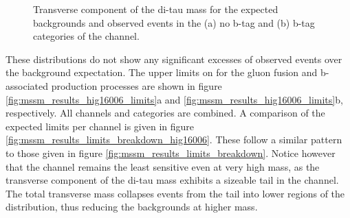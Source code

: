 \begin{figure}[h!]
\begin{center}
\end{center}
\caption[Transverse component of the di-tau mass for the expected backgrounds
and observed events in the no b-tag and b-tag categories of the \emu channel.]{Transverse component of the di-tau mass for the expected backgrounds and
observed events in the (a) no b-tag and (b) b-tag categories of the \emu channel.}
\label{fig:mssm_hig16006_mtsv_em}
\end{figure}
\clearpage

These distributions do not show any significant excesses of observed events over
the background expectation. The upper limits
on \xsbr for the gluon fusion and b-associated production
processes are shown in figure \ref{fig:mssm_results_hig16006_limits}a
and \ref{fig:mssm_results_hig16006_limits}b, respectively. All channels and categories are combined. A comparison of
the expected limits per channel is given in figure \ref{fig:mssm_results_limits_breakdown_hig16006}.
These follow a similar pattern to those given in figure \ref{fig:mssm_results_limits_breakdown}. Notice
however that the \emu channel remains the least sensitive even at very high mass, as the
transverse component of the di-tau mass exhibits a sizeable \ttbar tail in the \emu channel. The total
transverse mass collapses events from the tail into lower regions of the distribution, thus reducing the backgrounds
at higher mass.

